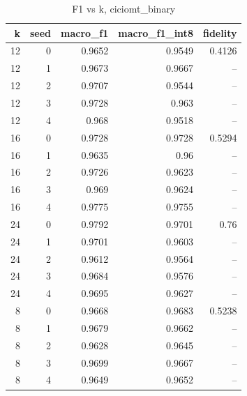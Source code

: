 \begin{table}
\caption{F1 vs k, ciciomt_binary}
\begin{tabular}{rrrrr}
\toprule
k & seed & macro_f1 & macro_f1_int8 & fidelity \\
\midrule
12 & 0 & 0.9652 & 0.9549 & 0.4126 \\
12 & 1 & 0.9673 & 0.9667 & -- \\
12 & 2 & 0.9707 & 0.9544 & -- \\
12 & 3 & 0.9728 & 0.963 & -- \\
12 & 4 & 0.968 & 0.9518 & -- \\
16 & 0 & 0.9728 & 0.9728 & 0.5294 \\
16 & 1 & 0.9635 & 0.96 & -- \\
16 & 2 & 0.9726 & 0.9623 & -- \\
16 & 3 & 0.969 & 0.9624 & -- \\
16 & 4 & 0.9775 & 0.9755 & -- \\
24 & 0 & 0.9792 & 0.9701 & 0.76 \\
24 & 1 & 0.9701 & 0.9603 & -- \\
24 & 2 & 0.9612 & 0.9564 & -- \\
24 & 3 & 0.9684 & 0.9576 & -- \\
24 & 4 & 0.9695 & 0.9627 & -- \\
8 & 0 & 0.9668 & 0.9683 & 0.5238 \\
8 & 1 & 0.9679 & 0.9662 & -- \\
8 & 2 & 0.9628 & 0.9645 & -- \\
8 & 3 & 0.9699 & 0.9667 & -- \\
8 & 4 & 0.9649 & 0.9652 & -- \\
\bottomrule
\end{tabular}
\end{table}
